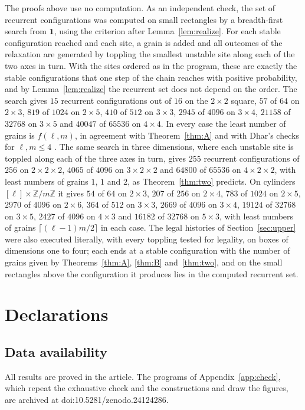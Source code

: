\documentclass[11pt]{amsart}
\theoremstyle{definition}
\newcommand{\ZZ}{\mathbb{Z}}
\newcommand{\one}{\mathbf 1}
\newcommand{\zenodoCodeDOI}{10.5281/zenodo.24124286}
\begin{document}
The proofs above use no computation. As an independent check, the set of recurrent configurations was computed on small rectangles by a breadth-first search from $\one$, using the criterion after Lemma~\ref{lem:realize}. For each stable configuration reached and each site, a grain is added and all outcomes of the relaxation are generated by toppling the smallest unstable site along each of the two axes in turn. With the sites ordered as in the program, these are exactly the stable configurations that one step of the chain reaches with positive probability, and by Lemma~\ref{lem:realize} the recurrent set does not depend on the order. The search gives $15$ recurrent configurations out of $16$ on the $2\times2$ square, $57$ of $64$ on $2\times3$, $819$ of $1024$ on $2\times5$, $410$ of $512$ on $3\times3$, $2945$ of $4096$ on $3\times4$, $21158$ of $32768$ on $3\times5$ and $40047$ of $65536$ on $4\times4$. In every case the least number of grains is $f(\ell,m)$, in agreement with Theorem~\ref{thm:A} and with Dhar's checks for $\ell,m\le4$ \cite[\S6]{Dha99b}. The same search in three dimensions, where each unstable site is toppled along each of the three axes in turn, gives $255$ recurrent configurations of $256$ on $2\times2\times2$, $4065$ of $4096$ on $3\times2\times2$ and $64800$ of $65536$ on $4\times2\times2$, with least numbers of grains $1$, $1$ and $2$, as Theorem~\ref{thm:two} predicts. On cylinders $[\ell]\times\ZZ/m\ZZ$ it gives $54$ of $64$ on $2\times3$, $207$ of $256$ on $2\times4$, $783$ of $1024$ on $2\times5$, $2970$ of $4096$ on $2\times6$, $364$ of $512$ on $3\times3$, $2669$ of $4096$ on $3\times4$, $19124$ of $32768$ on $3\times5$, $2427$ of $4096$ on $4\times3$ and $16182$ of $32768$ on $5\times3$, with least numbers of grains $\lceil(\ell-1)m/2\rceil$ in each case. The legal histories of Section~\ref{sec:upper} were also executed literally, with every toppling tested for legality, on boxes of dimensions one to four; each ends at a stable configuration with the number of grains given by Theorems~\ref{thm:A}, \ref{thm:B} and~\ref{thm:two}, and on the small rectangles above the configuration it produces lies in the computed recurrent set.

\section*{Declarations}

\subsection*{Data availability}
All results are proved in the article. The programs of Appendix~\ref{app:check}, which repeat the exhaustive check and the constructions and draw the figures, are archived at doi:\zenodoCodeDOI.
\end{document}
